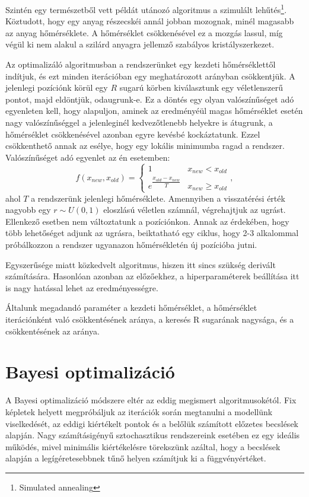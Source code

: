 Szintén egy természetből vett példát utánozó algoritmus a szimulált lehűtés\footnote{Simulated annealing}. Köztudott, hogy egy anyag részecskéi annál jobban mozognak, minél magasabb az anyag hőmérséklete. A hőmérséklet csökkenésével ez a mozgás lassul, míg végül ki nem alakul a szilárd anyagra jellemző szabályos kristályszerkezet.

Az optimalizáló algoritmusban a rendszerünket egy kezdeti hőmérséklettől indítjuk, és ezt minden iterációban egy meghatározott arányban csökkentjük. A jelenlegi pozíciónk körül egy $R$ sugarú körben kiválasztunk egy véletlenszerű pontot, majd eldöntjük, odaugrunk-e. Ez a döntés egy olyan valószínűséget adó egyenleten kell, hogy alapuljon, aminek az eredményéül magas hőmérséklet esetén nagy valószínűséggel a jelenleginél kedvezőtlenebb helyekre is átugrunk, a hőmérséklet csökkenésével azonban egyre kevésbé kockáztatunk. Ezzel csökkenthető annak az esélye, hogy egy lokális minimumba ragad a rendszer.
Valószínűséget adó egyenlet az én esetemben:
\begin{equation*}
f(x_{new},x_{old})=
\begin{cases}
	1 & x_{new}<x_{old}\\
	e^{\dfrac{x_{old}-x_{new}}{T}} & x_{new}\ge x_{old}
\end{cases},
\end{equation*}
ahol $T$ a rendszerünk jelenlegi hőmérséklete. Amennyiben a visszatérési érték nagyobb egy $r\sim U(0,1)$ eloszlású véletlen számnál, végrehajtjuk az ugrást. Ellenkező esetben nem változtatunk a pozíciónkon. Annak az érdekében, hogy több lehetőséget adjunk az ugrásra, beiktatható egy ciklus, hogy 2-3 alkalommal próbálkozzon a rendszer ugyanazon hőmérsékletén új pozícióba jutni.

Egyszerűsége miatt közkedvelt algoritmus, hiszen itt sincs szükség derivált számítására. Hasonlóan azonban az előzőekhez, a hiperparaméterek beállítása itt is nagy hatással lehet az eredményességre.

Általunk megadandó paraméter a kezdeti hőmérséklet, a hőmérséklet iterációnként való csökkentésének aránya, a keresés R sugarának nagysága, és a csökkentésének az aránya.

\section{Bayesi optimalizáció}
A Bayesi optimalizáció módszere eltér az eddig megismert algoritmusokétól. Fix képletek helyett megpróbáljuk az iterációk során megtanulni a modellünk viselkedését, az eddigi kiértékelt pontok és a belőlük számított előzetes becslések alapján. Nagy számításigényű sztochasztikus rendszereink esetében ez egy ideális működés, mivel minimális kiértékelésre törekszünk azáltal, hogy a becslések alapján a legígéretesebbnek tűnő helyen számítjuk ki a függvényértéket.

